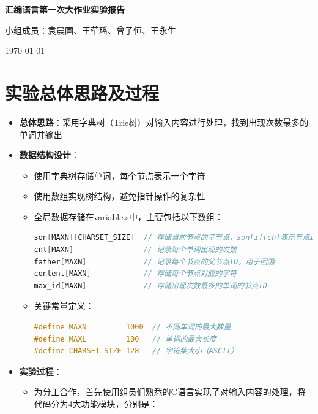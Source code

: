 \documentclass[10pt,a4paper]{article}
\begin{document}
\begin{center}
    \LARGE{\textbf{汇编语言第一次大作业实验报告}}
    
    \vspace{0.5cm}
    \large{小组成员：袁晨圃、王荦璠、曾子恒、王永生}
    
    \vspace{0.3cm}
    \today
\end{center}

\section{实验总体思路及过程}

\begin{itemize}
    \item \textbf{总体思路}：采用字典树（Trie树）对输入内容进行处理，找到出现次数最多的单词并输出
    \item \textbf{数据结构设计}：
    \begin{itemize}
        \item 使用字典树存储单词，每个节点表示一个字符
        \item 使用数组实现树结构，避免指针操作的复杂性
        \item 全局数据存储在variable.s中，主要包括以下数组：
        
        \begin{lstlisting}[language=C]
son[MAXN][CHARSET_SIZE]  // 存储当前节点的子节点，son[i][ch]表示节点i的字符ch子节点的ID
cnt[MAXN]                // 记录每个单词出现的次数
father[MAXN]             // 记录每个节点的父节点ID，用于回溯
content[MAXN]            // 存储每个节点对应的字符
max_id[MAXN]             // 存储出现次数最多的单词的节点ID
        \end{lstlisting}
        
        \item 关键常量定义：
        \begin{lstlisting}[language=C]
#define MAXN         1000  // 不同单词的最大数量
#define MAXL         100   // 单词的最大长度
#define CHARSET_SIZE 128   // 字符集大小（ASCII）
        \end{lstlisting}
    \end{itemize}
    \item \textbf{实验过程}：
    \begin{itemize}
        \item 为分工合作，首先使用组员们熟悉的C语言实现了对输入内容的处理，将代码分为4大功能模块，分别是：
        

\end{itemize}
\end{itemize}
\end{document}
